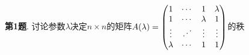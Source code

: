 
\renewcommand{\newpageorvspace}{\vspace{2em}}

\date{2021-11-12  第四次习题课}



\maketitle

{\bf 第1题}. 讨论参数$\lambda$决定$n\times n$的矩阵$A(\lambda) = \begin{pmatrix} 1 & \cdots & 1 & \lambda \\ 1 & \cdots & \lambda & 1 \\ \vdots & \reflectbox{$\ddots$} & \vdots & \vdots \\ \lambda & \cdots & 1 & 1 \end{pmatrix}$的秩

